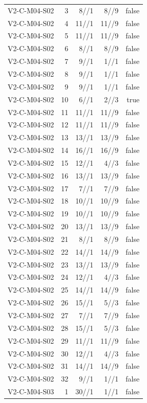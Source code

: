 {\begin{longtable}{lrrrr}
V2-C-M04-S02 & 3 & 8//1 & 8//9 & false \\
V2-C-M04-S02 & 4 & 11//1 & 11//9 & false \\
V2-C-M04-S02 & 5 & 11//1 & 11//9 & false \\
V2-C-M04-S02 & 6 & 8//1 & 8//9 & false \\
V2-C-M04-S02 & 7 & 9//1 & 1//1 & false \\
V2-C-M04-S02 & 8 & 9//1 & 1//1 & false \\
V2-C-M04-S02 & 9 & 9//1 & 1//1 & false \\
V2-C-M04-S02 & 10 & 6//1 & 2//3 & true \\
V2-C-M04-S02 & 11 & 11//1 & 11//9 & false \\
V2-C-M04-S02 & 12 & 11//1 & 11//9 & false \\
V2-C-M04-S02 & 13 & 13//1 & 13//9 & false \\
V2-C-M04-S02 & 14 & 16//1 & 16//9 & false \\
V2-C-M04-S02 & 15 & 12//1 & 4//3 & false \\
V2-C-M04-S02 & 16 & 13//1 & 13//9 & false \\
V2-C-M04-S02 & 17 & 7//1 & 7//9 & false \\
V2-C-M04-S02 & 18 & 10//1 & 10//9 & false \\
V2-C-M04-S02 & 19 & 10//1 & 10//9 & false \\
V2-C-M04-S02 & 20 & 13//1 & 13//9 & false \\
V2-C-M04-S02 & 21 & 8//1 & 8//9 & false \\
V2-C-M04-S02 & 22 & 14//1 & 14//9 & false \\
V2-C-M04-S02 & 23 & 13//1 & 13//9 & false \\
V2-C-M04-S02 & 24 & 12//1 & 4//3 & false \\
V2-C-M04-S02 & 25 & 14//1 & 14//9 & false \\
V2-C-M04-S02 & 26 & 15//1 & 5//3 & false \\
V2-C-M04-S02 & 27 & 7//1 & 7//9 & false \\
V2-C-M04-S02 & 28 & 15//1 & 5//3 & false \\
V2-C-M04-S02 & 29 & 11//1 & 11//9 & false \\
V2-C-M04-S02 & 30 & 12//1 & 4//3 & false \\
V2-C-M04-S02 & 31 & 14//1 & 14//9 & false \\
V2-C-M04-S02 & 32 & 9//1 & 1//1 & false \\
V2-C-M04-S03 & 1 & 30//1 & 1//1 & false \\

\end{longtable}}
